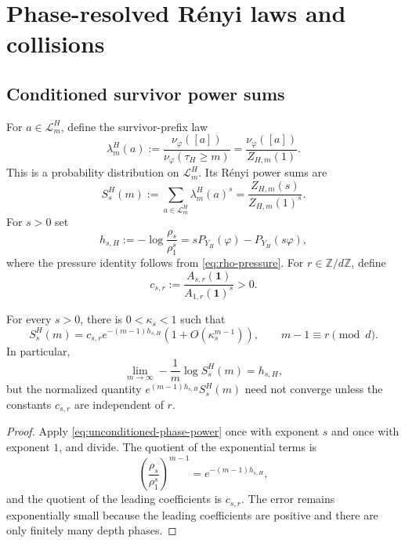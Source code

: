 \section{Phase-resolved R\'enyi laws and collisions}
\label{sec:double-budget}

\subsection{Conditioned survivor power sums}

For \(a\in\mathcal L_m^H\), define the survivor-prefix law
\[
  \lambda_m^H(a)
  :=\frac{\nu_\varphi([a])}{\nu_\varphi(\tau_H\geq m)}
  =\frac{\nu_\varphi([a])}{Z_{H,m}(1)}.
\]
This is a probability distribution on \(\mathcal L_m^H\).  Its
R\'enyi power sums are
\[
  S_s^H(m):=\sum_{a\in\mathcal L_m^H}\lambda_m^H(a)^s
  =\frac{Z_{H,m}(s)}{Z_{H,m}(1)^s}.
\]
For \(s>0\) set
\begin{equation}
  h_{s,H}:=-\log\frac{\rho_s}{\rho_1^s}
  =sP_{Y_H}(\varphi)-P_{Y_H}(s\varphi),
  \label{eq:renyi-rate}
\end{equation}
where the pressure identity follows from \eqref{eq:rho-pressure}.  For
\(r\in\mathbb Z/d\mathbb Z\), define
\begin{equation}
  c_{s,r}
  :=\frac{A_{s,r}(\mathbf1)}{A_{1,r}(\mathbf1)^s}>0.
  \label{eq:phase-renyi-constant}
\end{equation}

\begin{theorem}
\label{thm:periodic-renyi}
For every \(s>0\), there is \(0<\kappa_s<1\) such that
\begin{equation}
  S_s^H(m)
  =c_{s,r}e^{-(m-1)h_{s,H}}
   (1+O(\kappa_s^{m-1})),
  \qquad m-1\equiv r\pmod d.
  \label{eq:conditioned-phase-power}
\end{equation}
In particular,
\[
  \lim_{m\to\infty}-\frac1m\log S_s^H(m)=h_{s,H},
\]
but the normalized quantity
\(e^{(m-1)h_{s,H}}S_s^H(m)\) need not converge unless the constants
\(c_{s,r}\) are independent of \(r\).
\end{theorem}

\begin{proof}
Apply \eqref{eq:unconditioned-phase-power} once with exponent \(s\) and
once with exponent \(1\), and divide.  The quotient of the exponential
terms is
\[
  \left(\frac{\rho_s}{\rho_1^s}\right)^{m-1}
  =e^{-(m-1)h_{s,H}},
\]
and the quotient of the leading coefficients is \(c_{s,r}\).  The
error remains exponentially small because the leading coefficients are
positive and there are only finitely many depth phases.
\end{proof}

